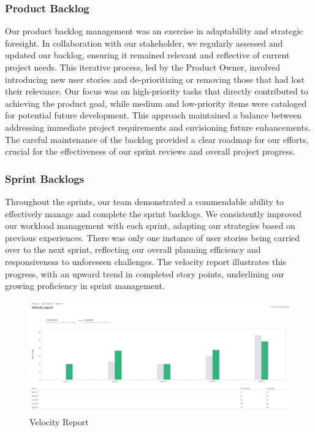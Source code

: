 \subsubsection{Product Backlog}
Our product backlog management was an exercise in adaptability and strategic foresight.
In collaboration with our stakeholder, we regularly assessed and updated our backlog, ensuring it remained relevant and reflective of current project needs.
This iterative process, led by the Product Owner, involved introducing new user stories and de-prioritizing or removing those that had lost their relevance.
Our focus was on high-priority tasks that directly contributed to achieving the product goal, while medium and low-priority items were cataloged for potential future development.
This approach maintained a balance between addressing immediate project requirements and envisioning future enhancements.
The careful maintenance of the backlog provided a clear roadmap for our efforts, crucial for the effectiveness of our sprint reviews and overall project progress.

\subsubsection{Sprint Backlogs}
Throughout the sprints, our team demonstrated a commendable ability to effectively manage and complete the sprint backlogs.
We consistently improved our workload management with each sprint, adapting our strategies based on previous experiences.
There was only one instance of user stories being carried over to the next sprint, reflecting our overall planning efficiency and responsiveness to unforeseen challenges.
The velocity report illustrates this progress, with an upward trend in completed story points, underlining our growing proficiency in sprint management.
\begin{figure}[h!]
    \centering
    \includegraphics[width=1\textwidth]{pictures/Scrum/velocity_report}
    \caption{Velocity Report}
    \label{fig:velocity_report}
\end{figure}

